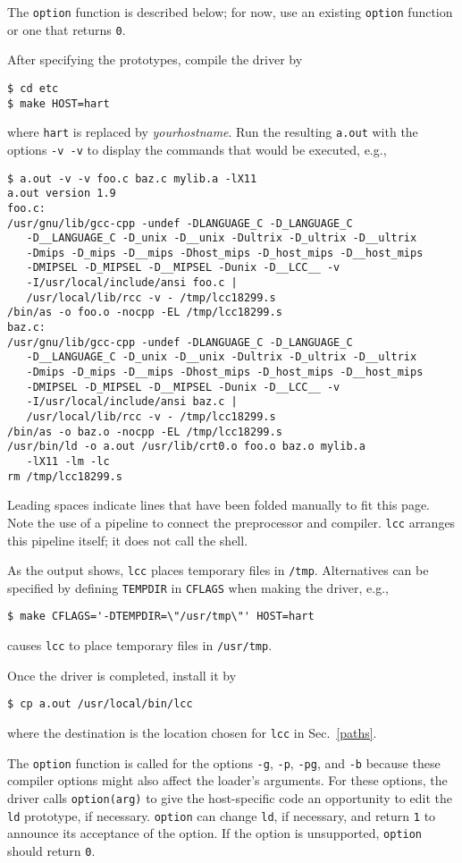 The \verb|option| function is described below;
for now, use an existing \verb|option| function or one that returns \verb|0|.

After specifying the prototypes, compile the driver by
\begin{verbatim}
$ cd etc
$ make HOST=hart
\end{verbatim}
where \verb|hart| is replaced by {\it yourhostname}.
Run the resulting \verb|a.out| with the options \verb|-v -v|
to display the commands that would be executed, e.g.,
\begin{verbatim}
$ a.out -v -v foo.c baz.c mylib.a -lX11
a.out version 1.9
foo.c:
/usr/gnu/lib/gcc-cpp -undef -DLANGUAGE_C -D_LANGUAGE_C
   -D__LANGUAGE_C -D_unix -D__unix -Dultrix -D_ultrix -D__ultrix
   -Dmips -D_mips -D__mips -Dhost_mips -D_host_mips -D__host_mips
   -DMIPSEL -D_MIPSEL -D__MIPSEL -Dunix -D__LCC__ -v
   -I/usr/local/include/ansi foo.c |
   /usr/local/lib/rcc -v - /tmp/lcc18299.s
/bin/as -o foo.o -nocpp -EL /tmp/lcc18299.s
baz.c:
/usr/gnu/lib/gcc-cpp -undef -DLANGUAGE_C -D_LANGUAGE_C
   -D__LANGUAGE_C -D_unix -D__unix -Dultrix -D_ultrix -D__ultrix
   -Dmips -D_mips -D__mips -Dhost_mips -D_host_mips -D__host_mips
   -DMIPSEL -D_MIPSEL -D__MIPSEL -Dunix -D__LCC__ -v
   -I/usr/local/include/ansi baz.c |
   /usr/local/lib/rcc -v - /tmp/lcc18299.s
/bin/as -o baz.o -nocpp -EL /tmp/lcc18299.s
/usr/bin/ld -o a.out /usr/lib/crt0.o foo.o baz.o mylib.a
   -lX11 -lm -lc
rm /tmp/lcc18299.s
\end{verbatim}
Leading spaces indicate lines that have been folded manually to fit this page.
Note the use of a pipeline to connect the preprocessor and compiler.
\verb|lcc| arranges this pipeline itself; it does not call the shell.
 
As the output shows, \verb|lcc| places temporary files in \verb|/tmp|.
Alternatives can be specified by defining \verb|TEMPDIR| in \verb|CFLAGS|
when making the driver, e.g.,
\begin{verbatim}
$ make CFLAGS='-DTEMPDIR=\"/usr/tmp\"' HOST=hart
\end{verbatim}
causes \verb|lcc| to place temporary files in \verb|/usr/tmp|.

Once the driver is completed, install it by
\begin{verbatim}
$ cp a.out /usr/local/bin/lcc
\end{verbatim}
where the destination is the location chosen for \verb|lcc| in Sec.~\ref{paths}.

The \verb|option| function is called for the options
\verb|-g|, \verb|-p|, \verb|-pg|, and \verb|-b| because these compiler options might
also affect the loader's arguments. For these options,
the driver calls \verb|option(arg)| to give the host-specific
code an opportunity to edit the \verb|ld| prototype, if necessary.
\verb|option| can change \verb|ld|, if necessary, and return \verb|1| to
announce its acceptance of the option. If the option
is unsupported, \verb|option| should return \verb|0|.


